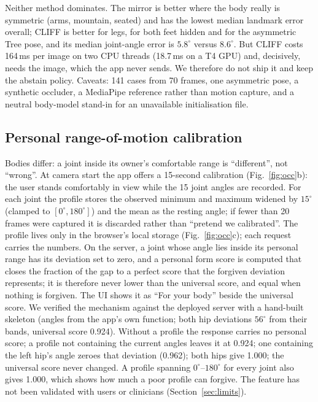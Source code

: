 Neither method dominates. The mirror is better where the body really is symmetric (arms, mountain, seated) and has the lowest median landmark error overall; CLIFF is better for legs, for both feet hidden and for the asymmetric Tree pose, and its median joint-angle error is $5.8^\circ$ versus $8.6^\circ$. But CLIFF costs 164\,ms per image on two CPU threads (18.7\,ms on a T4 GPU) and, decisively, needs the image, which the app never sends. We therefore do not ship it and keep the abstain policy. Caveats: 141 cases from 70 frames, one asymmetric pose, a synthetic occluder, a MediaPipe reference rather than motion capture, and a neutral body-model stand-in for an unavailable initialisation file.

\subsection{Personal range-of-motion calibration}\label{sec:calib}
Bodies differ: a joint inside its owner's comfortable range is ``different'', not ``wrong''. At camera start the app offers a 15-second calibration (Fig.~\ref{fig:occ}b): the user stands comfortably in view while the 15 joint angles are recorded. For each joint the profile stores the observed minimum and maximum widened by $15^\circ$ (clamped to $[0^\circ,180^\circ]$) and the mean as the resting angle; if fewer than 20 frames were captured it is discarded rather than ``pretend we calibrated''. The profile lives only in the browser's local storage (Fig.~\ref{fig:occ}c); each request carries the numbers. On the server, a joint whose angle lies inside its personal range has its deviation set to zero, and a personal form score is computed that closes the fraction of the gap to a perfect score that the forgiven deviation represents; it is therefore never lower than the universal score, and equal when nothing is forgiven. The UI shows it as ``For your body'' beside the universal score. We verified the mechanism against the deployed server with a hand-built skeleton (angles from the app's own function; both hip deviations $56^\circ$ from their bands, universal score 0.924). Without a profile the response carries no personal score; a profile not containing the current angles leaves it at 0.924; one containing the left hip's angle zeroes that deviation (0.962); both hips give 1.000; the universal score never changed. A profile spanning $0^\circ$--$180^\circ$ for every joint also gives 1.000, which shows how much a poor profile can forgive. The feature has not been validated with users or clinicians (Section~\ref{sec:limits}).

